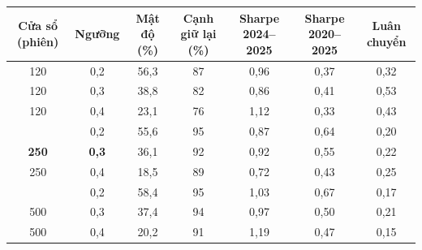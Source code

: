 \begin{tabular}{@{}ccccccc@{}}
\toprule
Cửa sổ (phiên) & Ngưỡng & Mật độ (\%) & Cạnh giữ lại (\%) & Sharpe 2024--2025 & Sharpe 2020--2025 & Luân chuyển \\
\midrule
120 & 0{,}2 & 56{,}3 & 87 & 0{,}96 & 0{,}37 & 0{,}32 \\
120 & 0{,}3 & 38{,}8 & 82 & 0{,}86 & 0{,}41 & 0{,}53 \\
120 & 0{,}4 & 23{,}1 & 76 & 1{,}12 & 0{,}33 & 0{,}43 \\
\addlinespace
250 & 0{,}2 & 55{,}6 & 95 & 0{,}87 & 0{,}64 & 0{,}20 \\
\textbf{250} & \textbf{0{,}3} & 36{,}1 & 92 & 0{,}92 & 0{,}55 & 0{,}22 \\
250 & 0{,}4 & 18{,}5 & 89 & 0{,}72 & 0{,}43 & 0{,}25 \\
\addlinespace
500 & 0{,}2 & 58{,}4 & 95 & 1{,}03 & 0{,}67 & 0{,}17 \\
500 & 0{,}3 & 37{,}4 & 94 & 0{,}97 & 0{,}50 & 0{,}21 \\
500 & 0{,}4 & 20{,}2 & 91 & 1{,}19 & 0{,}47 & 0{,}15 \\
\bottomrule
\end{tabular}
